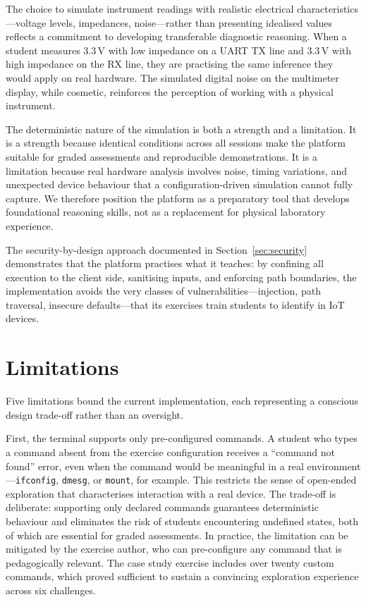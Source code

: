 The choice to simulate instrument readings with realistic electrical characteristics---voltage levels, impedances, noise---rather than presenting idealised values reflects a commitment to developing transferable diagnostic reasoning. When a student measures 3.3\,V with low impedance on a UART TX line and 3.3\,V with high impedance on the RX line, they are practising the same inference they would apply on real hardware. The simulated digital noise on the multimeter display, while cosmetic, reinforces the perception of working with a physical instrument.

The deterministic nature of the simulation is both a strength and a limitation. It is a strength because identical conditions across all sessions make the platform suitable for graded assessments and reproducible demonstrations. It is a limitation because real hardware analysis involves noise, timing variations, and unexpected device behaviour that a configuration-driven simulation cannot fully capture. We therefore position the platform as a preparatory tool that develops foundational reasoning skills, not as a replacement for physical laboratory experience.

The security-by-design approach documented in Section~\ref{sec:security} demonstrates that the platform practises what it teaches: by confining all execution to the client side, sanitising inputs, and enforcing path boundaries, the implementation avoids the very classes of vulnerabilities---injection, path traversal, insecure defaults---that its exercises train students to identify in IoT devices.

\section{Limitations}\label{sec:limitations}

Five limitations bound the current implementation, each representing a conscious design trade-off rather than an oversight.

First, the terminal supports only pre-configured commands. A student who types a command absent from the exercise configuration receives a ``command not found'' error, even when the command would be meaningful in a real environment---\texttt{ifconfig}, \texttt{dmesg}, or \texttt{mount}, for example. This restricts the sense of open-ended exploration that characterises interaction with a real device. The trade-off is deliberate: supporting only declared commands guarantees deterministic behaviour and eliminates the risk of students encountering undefined states, both of which are essential for graded assessments. In practice, the limitation can be mitigated by the exercise author, who can pre-configure any command that is pedagogically relevant. The case study exercise includes over twenty custom commands, which proved sufficient to sustain a convincing exploration experience across six challenges.

